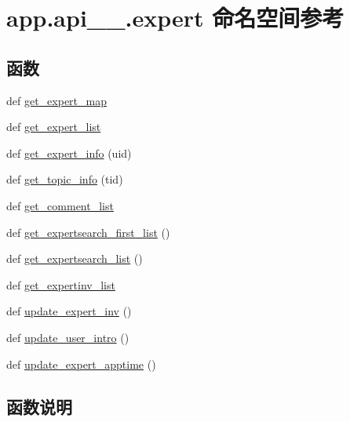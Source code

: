 \hypertarget{namespaceapp_1_1api__1__0_1_1expert}{}\section{app.\+api\+\_\+\_.\+expert 命名空间参考}
\label{namespaceapp_1_1api__1__0_1_1expert}
\subsection*{函数}
\begin{DoxyCompactItemize}
\item 
def \hyperlink{namespaceapp_1_1api__1__0_1_1expert_ad67d0db8aad4a90a70ad5af337076f99}{get\+\_\+expert\+\_\+map}
\item 
def \hyperlink{namespaceapp_1_1api__1__0_1_1expert_a2aef8e3a305172d5fc2ec7ebd4386c14}{get\+\_\+expert\+\_\+list}
\item 
def \hyperlink{namespaceapp_1_1api__1__0_1_1expert_aeb7e02e987f3951d72f2df8a8de62613}{get\+\_\+expert\+\_\+info} (uid)
\item 
def \hyperlink{namespaceapp_1_1api__1__0_1_1expert_acf792e35e5b48243540dbac094c1628c}{get\+\_\+topic\+\_\+info} (tid)
\item 
def \hyperlink{namespaceapp_1_1api__1__0_1_1expert_a90c29c044f8ce0bb1d8c550e73b9a143}{get\+\_\+comment\+\_\+list}
\item 
def \hyperlink{namespaceapp_1_1api__1__0_1_1expert_adbc903e06dc21ff52496dde9502a8d32}{get\+\_\+expertsearch\+\_\+first\+\_\+list} ()
\item 
def \hyperlink{namespaceapp_1_1api__1__0_1_1expert_a231f17add6f77504a34b2471ec0d89fc}{get\+\_\+expertsearch\+\_\+list} ()
\item 
def \hyperlink{namespaceapp_1_1api__1__0_1_1expert_ac5a2e095710d8463a6208c8fe679c0c3}{get\+\_\+expertinv\+\_\+list}
\item 
def \hyperlink{namespaceapp_1_1api__1__0_1_1expert_a6bcc721401e0183a61d6dca2ce7e5cd7}{update\+\_\+expert\+\_\+inv} ()
\item 
def \hyperlink{namespaceapp_1_1api__1__0_1_1expert_aba553c448587fe1245d73fb42bf47741}{update\+\_\+user\+\_\+intro} ()
\item 
def \hyperlink{namespaceapp_1_1api__1__0_1_1expert_af76dad7f4f1c0ff33d1487959ea61b1d}{update\+\_\+expert\+\_\+apptime} ()
\end{DoxyCompactItemize}


\subsection{函数说明}
\hypertarget{namespaceapp_1_1api__1__0_1_1expert_a90c29c044f8ce0bb1d8c550e73b9a143}{}
